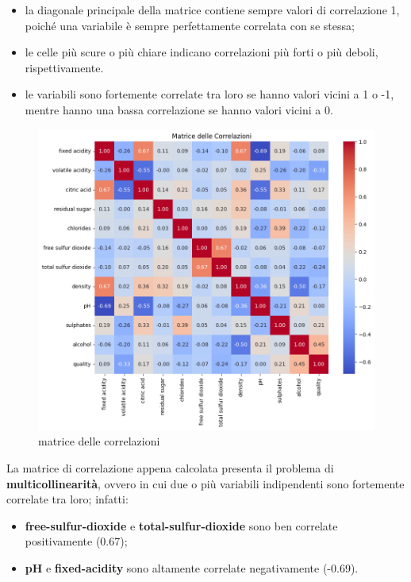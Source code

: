 \documentclass{article}
\begin{document}
\begin{titlepage}
        \begin{itemize}
            \item la diagonale principale della matrice contiene sempre valori di correlazione 1, poiché una variabile è sempre perfettamente correlata con se stessa;
            \item le celle più scure o più chiare indicano correlazioni più forti o più deboli, rispettivamente.
            \item le variabili sono fortemente correlate tra loro se hanno valori vicini a 1 o -1, mentre hanno una bassa correlazione se hanno valori vicini a 0.
        \end{itemize}

        \begin{figure}[ht]
            \centering
            \includegraphics[width=0.6\linewidth]{correlation-matrix.png}
            \caption{  matrice delle correlazioni}
            \label{fig:enter-label}
        \end{figure}

        \newpage
        La matrice di correlazione appena calcolata presenta il problema di \textbf{multicollinearità}, ovvero in cui due o più variabili indipendenti sono fortemente correlate tra loro; infatti:
        \begin{itemize}
            \item \textbf{free-sulfur-dioxide} e \textbf{total-sulfur-dioxide} sono ben correlate positivamente (0.67);
            \item\textbf{pH} e \textbf{fixed-acidity} sono altamente correlate negativamente (-0.69).
        \end{itemize}


\end{titlepage}
\end{document}
